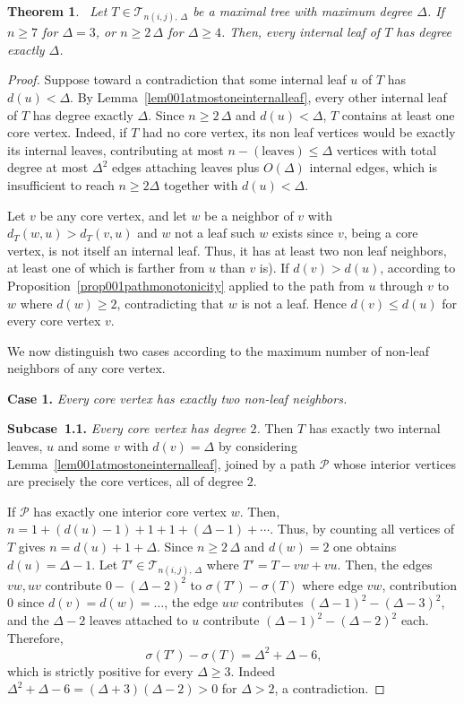 \documentclass[12pt]{amsart}
\newtheorem{theorem}{Theorem}[section]
\newcommand{\TT}{\mathcal{T}}
\begin{document}
\begin{theorem}~\label{thm001internal}
Let $T\in \TT_{n(i,j),\,\Delta}$ be a maximal tree with maximum degree $\Delta$. If $n\geqslant 7$ for $\Delta=3$, or $n\geqslant 2\,\Delta$ for $\Delta\geqslant 4$. Then, every internal leaf of $T$ has degree exactly $\Delta$.
\end{theorem}
\begin{proof}
Suppose toward a contradiction that some
internal leaf $u$ of $T$ has $d(u)<\Delta$. By
Lemma~\ref{lem001atmostoneinternalleaf}, every other internal leaf of $T$
has degree exactly $\Delta$. Since $n\geqslant 2\,\Delta$ and $d(u)<\Delta$, $T$
contains at least one core vertex. Indeed, if $T$ had no core vertex, its non leaf vertices would be exactly its internal leaves, contributing at most
$n-(\text{leaves}) \leqslant \Delta$ vertices with total degree at most $\Delta^2$
edges attaching leaves plus $O(\Delta)$ internal edges, which is insufficient
to reach $n\geqslant 2\Delta$ together with $d(u)<\Delta$.

Let $v$ be any core vertex, and let $w$ be a neighbor of $v$ with $d_T(w,u)>d_T(v,u)$ and $w$ not a leaf such $w$ exists since $v$, being a core vertex, is not itself an internal leaf. Thus, it has at least two non leaf neighbors, at least one of which is farther from
$u$ than $v$ is). If $d(v)>d(u)$, according to Proposition~\ref{prop001pathmonotonicity}
applied to the path from $u$ through $v$ to $w$ where $d(w)\geqslant 2$,
contradicting that $w$ is not a leaf. Hence $d(v)\leqslant d(u)$ for every core
vertex $v$.

We now distinguish two cases according to the maximum number of non-leaf
neighbors of any core vertex.

\medskip

\noindent \textbf{Case 1.} \textit{Every core vertex has exactly two non-leaf neighbors.}

\smallskip

\textbf{Subcase~1.1.} \emph{Every core vertex has degree $2$.} Then $T$ has exactly
two internal leaves, $u$ and some $v$ with $d(v)=\Delta$ by considering 
Lemma~\ref{lem001atmostoneinternalleaf}, joined by a path $\mathcal P$ whose
interior vertices are precisely the core vertices, all of degree $2$.

If $\mathcal P$ has exactly one interior core vertex $w$. Then, $n=1+(d(u)-1)+1+1+(\Delta-1)+\cdots$.  Thus, by counting all vertices of $T$ gives
$n=d(u)+1+\Delta$. Since $n\geqslant 2\,\Delta$ and $d(w)=2$ one
obtains $d(u)=\Delta-1$.  Let $T'\in \TT_{n(i,j),\,\Delta}$ where  $T' = T-vw+vu$. Then, the edges $vw,uv$ contribute
$0-(\Delta-2)^2$ to $\sigma(T')-\sigma(T)$ where edge $vw$, contribution $0$ since
$d(v)=d(w)=\ldots$, the edge $uw$   contributes $(\Delta-1)^2-(\Delta-3)^2$, and the $\Delta-2$ leaves attached to $u$ contribute $(\Delta-1)^2-(\Delta-2)^2$ each. Therefore,
\begin{equation}~\label{eqq01subcase1a}
\sigma(T')-\sigma(T)=\Delta^2+\Delta-6,
\end{equation}
which is strictly positive for every $\Delta\geqslant 3$. Indeed
$\Delta^2+\Delta-6=(\Delta+3)(\Delta-2)>0$ for $\Delta>2$, a contradiction.


\end{proof}
\end{document}
